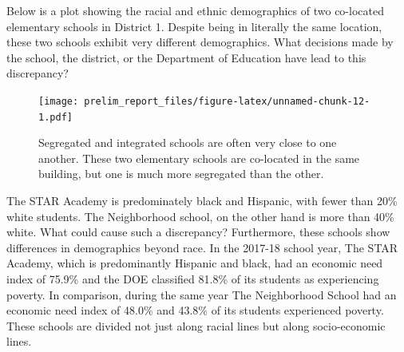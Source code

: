\documentclass[11pt,]{article}
\begin{document}
Below is a plot showing the racial and ethnic demographics of two co-located elementary schools in District 1. Despite being in literally the same location, these two schools exhibit very different demographics. What decisions made by the school, the district, or the Department of Education have lead to this discrepancy?
\begin{figure}
\centering
\texttt{[image: prelim\_report\_files/figure-latex/unnamed-chunk-12-1.pdf]}
\caption{\label{fig:unnamed-chunk-12}Segregated and integrated schools are often very close to one another. These two elementary schools are co-located in the same building, but one is much more segregated than the other.}
\end{figure}
The STAR Academy is predominately black and Hispanic, with fewer than 20\% white students. The Neighborhood school, on the other hand is more than 40\% white. What could cause such a discrepancy? Furthermore, these schools show differences in demographics beyond race. In the 2017-18 school year, The STAR Academy, which is predominantly Hispanic and black, had an economic need index of 75.9\% and the DOE classified 81.8\% of its students as experiencing poverty. In comparison, during the same year The Neighborhood School had an economic need index of 48.0\% and 43.8\% of its students experienced poverty. These schools are divided not just along racial lines but along socio-economic lines.
\end{document}
